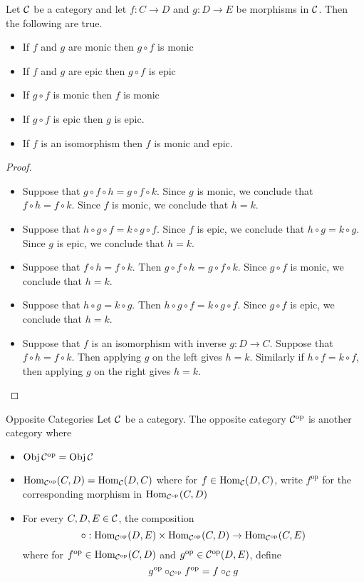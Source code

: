 \documentclass[a4paper]{article}
\begin{document}
\begin{prp}{}{} Let $\mathcal{C}$ be a category and let $f:C\to D$ and $g:D\to E$ be morphisms in $\mathcal{C}$. Then the following are true. 
\begin{itemize}
\item If $f$ and $g$ are monic then $g\circ f$ is monic
\item If $f$ and $g$ are epic then $g\circ f$ is epic
\item If $g\circ f$ is monic then $f$ is monic
\item If $g\circ f$ is epic then $g$ is epic. 
\item If $f$ is an isomorphism then $f$ is monic and epic. 
\end{itemize} \tcbline
\begin{proof}~\\
\begin{itemize}
\item Suppose that $g\circ f\circ h=g\circ f\circ k$. Since $g$ is monic, we conclude that $f\circ h=f\circ k$. Since $f$ is monic, we conclude that $h=k$. 
\item Suppose that $h\circ g\circ f=k\circ g\circ f$. Since $f$ is epic, we conclude that $h\circ g=k\circ g$. Since $g$ is epic, we conclude that $h=k$. 
\item Suppose that $f\circ h=f\circ k$. Then $g\circ f\circ h=g\circ f\circ k$. Since $g\circ f$ is monic, we conclude that $h=k$. 
\item Suppose that $h\circ g=k\circ g$. Then $h\circ g\circ f=k\circ g\circ f$. Since $g\circ f$ is epic, we conclude that $h=k$. 
\item Suppose that $f$ is an isomorphism with inverse $g:D\to C$. Suppose that $f\circ h=f\circ k$. Then applying $g$ on the left gives $h=k$. Similarly if $h\circ f=k\circ f$, then applying $g$ on the right gives $h=k$. 
\end{itemize}
\end{proof}
\end{prp}

\begin{defn}{Opposite Categories}{} Let $\mathcal{C}$ be a category. The opposite category $\mathcal{C}^{\text{op}}$ is another category where
\begin{itemize}
\item $\operatorname{Obj}\mathcal{C}^{\text{op}}=\operatorname{Obj}\mathcal{C}$
\item $\operatorname{Hom}_{\mathcal{C}^{\text{op}}}(C,D)=\operatorname{Hom}_{\mathcal{C}}(D,C)$ where for $f\in\operatorname{Hom}_{\mathcal{C}}(D,C)$, write $f^{\text{op}}$ for the corresponding morphism in $\operatorname{Hom}_{\mathcal{C}^{\text{op}}}(C,D)$
\item For every $C,D,E\in\mathcal{C}$, the composition $$\circ:\operatorname{Hom}_{\mathcal{C}^{\text{op}}}(D,E)\times\operatorname{Hom}_{\mathcal{C}^{\text{op}}}(C,D)\to\operatorname{Hom}_{\mathcal{C}^{\text{op}}}(C,E)$$ where for $f^{\text{op}}\in\operatorname{Hom}_{\mathcal{C}^{\text{op}}}(C,D)$ and $g^{\text{op}}\in{\mathcal{C}^{\text{op}}}(D,E)$, define $$g^{\text{op}}\circ_{\mathcal{C}^{\text{op}}}f^{\text{op}}=f\circ_{\mathcal{C}} g$$
\end{itemize}
\end{defn}
\end{document}
